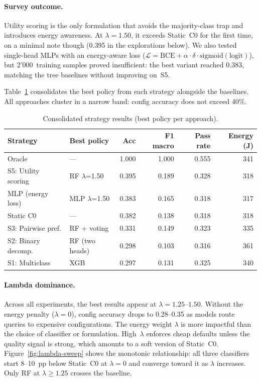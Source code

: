 \paragraph{Survey outcome.}
Utility scoring is the only formulation that avoids the majority-class
trap and introduces energy awareness.  At $\lambda = 1.50$, it exceeds
Static~C0 for the first time, on a minimal note though
(0.395 in the explorations below).  We also tested single-head MLPs
with an energy-aware loss ($\mathcal{L} = \text{BCE} + \alpha \cdot
\delta \cdot \text{sigmoid}(\text{logit})$), but 2{'}000~training
samples proved insufficient: the best variant reached 0.383, matching
the tree baselines without improving on~S5.

Table~\ref{tab:all-strategies} consolidates the best policy from each
strategy alongside the baselines.  All approaches cluster in a narrow
band: config accuracy does not exceed 40\%.

\begin{table}[h!]
\centering
\small
\begin{tabular}{l l r r r r}
\hline
\textbf{Strategy} & \textbf{Best policy} & \textbf{Acc} & \textbf{F1 macro} & \textbf{Pass rate} & \textbf{Energy (J)} \\
\hline
Oracle                 & ---                      & 1.000 & 1.000 & 0.555 & 341 \\
\hline
S5: Utility scoring    & RF $\lambda$=1.50        & 0.395 & 0.189 & 0.328 & 318 \\
MLP (energy loss)      & MLP $\lambda$=1.50       & 0.383 & 0.165 & 0.318 & 317 \\
\hline
Static C0              & ---                      & 0.382 & 0.138 & 0.318 & 318 \\
\hline
S3: Pairwise pref.     & RF + voting              & 0.331 & 0.149 & 0.323 & 335 \\
S2: Binary decomp.     & RF (two heads)           & 0.298 & 0.103 & 0.316 & 361 \\
S1: Multiclass         & XGB                      & 0.297 & 0.131 & 0.325 & 340 \\
\hline
\end{tabular}
\caption{Consolidated strategy results (best policy per approach).}
\label{tab:all-strategies}
\end{table}

\paragraph{Lambda dominance.}
Across all experiments, the best results appear at $\lambda = 1.25$--$1.50$.
Without the energy penalty ($\lambda = 0$), config accuracy drops to
0.28--0.35 as models route queries to expensive configurations.
The energy weight $\lambda$ is more impactful than the choice of
classifier or formulation.  High~$\lambda$ enforces cheap defaults
unless the quality signal is strong, which amounts to a soft version
of Static~C0.  Figure~\ref{fig:lambda-sweep} shows the monotonic
relationship: all three classifiers start 8--10~pp below Static~C0 at
$\lambda = 0$ and converge toward it as $\lambda$ increases.  Only RF
at $\lambda \geq 1.25$ crosses the baseline.

